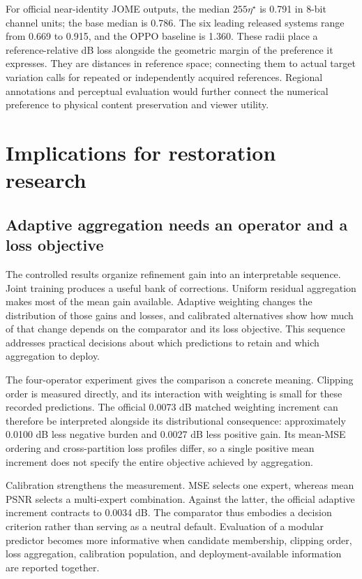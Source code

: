 \documentclass[12pt]{article}
\begin{document}
For official near-identity JOME outputs, the median $255\eta^\star$ is 0.791 in 8-bit channel units; the base median is 0.786. The six leading released systems range from 0.669 to 0.915, and the OPPO baseline is 1.360. These radii place a reference-relative dB loss alongside the geometric margin of the preference it expresses. They are distances in reference space; connecting them to actual target variation calls for repeated or independently acquired references. Regional annotations and perceptual evaluation would further connect the numerical preference to physical content preservation and viewer utility.

\section{Implications for restoration research}
\label{sec:discussion}
\subsection{Adaptive aggregation needs an operator and a loss objective}
The controlled results organize refinement gain into an interpretable sequence. Joint training produces a useful bank of corrections. Uniform residual aggregation makes most of the mean gain available. Adaptive weighting changes the distribution of those gains and losses, and calibrated alternatives show how much of that change depends on the comparator and its loss objective. This sequence addresses practical decisions about which predictions to retain and which aggregation to deploy.

The four-operator experiment gives the comparison a concrete meaning. Clipping order is measured directly, and its interaction with weighting is small for these recorded predictions. The official 0.0073 dB matched weighting increment can therefore be interpreted alongside its distributional consequence: approximately 0.0100 dB less negative burden and 0.0027 dB less positive gain. Its mean-MSE ordering and cross-partition loss profiles differ, so a single positive mean increment does not specify the entire objective achieved by aggregation.

Calibration strengthens the measurement. MSE selects one expert, whereas mean PSNR selects a multi-expert combination. Against the latter, the official adaptive increment contracts to 0.0034 dB. The comparator thus embodies a decision criterion rather than serving as a neutral default. Evaluation of a modular predictor becomes more informative when candidate membership, clipping order, loss aggregation, calibration population, and deployment-available information are reported together.
\end{document}
